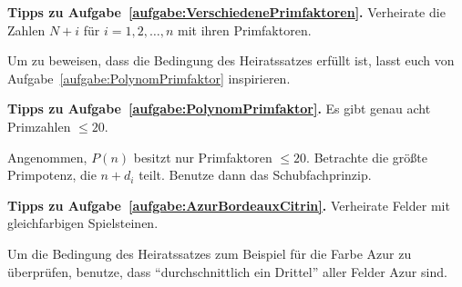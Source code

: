 \textbf{Tipps zu Aufgabe~\ref{aufgabe:VerschiedenePrimfaktoren}.} Verheirate die Zahlen $N+i$ für $i=1,2,\dotsc,n$ mit ihren Primfaktoren.

Um zu beweisen, dass die Bedingung des Heiratssatzes erfüllt ist, lasst euch von Aufgabe~\ref{aufgabe:PolynomPrimfaktor} inspirieren.

\textbf{Tipps zu Aufgabe~\ref{aufgabe:PolynomPrimfaktor}.} Es gibt genau acht Primzahlen $\leqslant 20$.

Angenommen, $P(n)$ besitzt nur Primfaktoren $\leqslant 20$. Betrachte die größte Primpotenz, die $n+d_i$ teilt. Benutze dann das Schubfachprinzip.

\textbf{Tipps zu Aufgabe~\ref{aufgabe:AzurBordeauxCitrin}.} Verheirate Felder mit gleichfarbigen Spielsteinen.

Um die Bedingung des Heiratssatzes zum Beispiel für die Farbe Azur zu überprüfen, benutze, dass \enquote{durchschnittlich ein Drittel} aller Felder Azur sind.